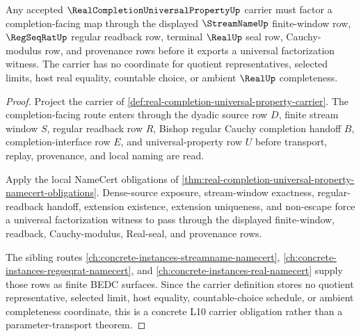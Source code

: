 \begin{theorem}
\label{thm:real-completion-universal-property-factorization-obligation}
Any accepted $\RealCompletionUniversalPropertyUp$ carrier must factor a completion-facing map through the displayed $\StreamNameUp$ finite-window row, $\RegSeqRatUp$ regular readback row, terminal $\RealUp$ seal row, Cauchy-modulus row, and provenance rows before it exports a universal factorization witness. The carrier has no coordinate for quotient representatives, selected limits, host real equality, countable choice, or ambient $\RealUp$ completeness.
\end{theorem}
\begin{proof}
Project the carrier of \autoref{def:real-completion-universal-property-carrier}. The completion-facing route enters through the dyadic source row $D$, finite stream window $S$, regular readback row $R$, Bishop regular Cauchy completion handoff $B$, completion-interface row $E$, and universal-property row $U$ before transport, replay, provenance, and local naming are read.

Apply the local NameCert obligations of \autoref{thm:real-completion-universal-property-namecert-obligations}. Dense-source exposure, stream-window exactness, regular-readback handoff, extension existence, extension uniqueness, and non-escape force a universal factorization witness to pass through the displayed finite-window, readback, Cauchy-modulus, Real-seal, and provenance rows.

The sibling routes \autoref{ch:concrete-instances-streamname-namecert}, \autoref{ch:concrete-instances-regseqrat-namecert}, and \autoref{ch:concrete-instances-real-namecert} supply those rows as finite BEDC surfaces. Since the carrier definition stores no quotient representative, selected limit, host equality, countable-choice schedule, or ambient completeness coordinate, this is a concrete L10 carrier obligation rather than a parameter-transport theorem.
\end{proof}

